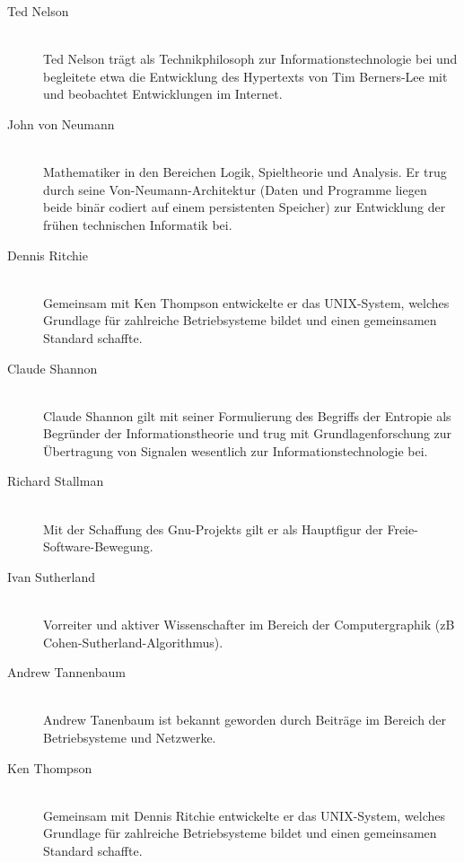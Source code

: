\begin{description}
  \item[Ted Nelson ] \hfill{} \\
    Ted Nelson trägt als Technikphilosoph zur Informationstechnologie bei und begleitete etwa die Entwicklung des Hypertexts von Tim Berners-Lee mit und beobachtet Entwicklungen im Internet.

  \item[John von Neumann ] \hfill{} \\
    Mathematiker in den Bereichen Logik, Spieltheorie und Analysis. Er trug durch seine Von-Neumann-Architektur (Daten und Programme liegen beide binär codiert auf einem persistenten Speicher) zur Entwicklung der frühen technischen Informatik bei.

  \item[Dennis Ritchie ] \hfill{} \\
    Gemeinsam mit Ken Thompson entwickelte er das UNIX-System, welches Grundlage für zahlreiche Betriebsysteme bildet und einen gemeinsamen Standard schaffte.

  \item[Claude Shannon ] \hfill{} \\
    Claude Shannon gilt mit seiner Formulierung des Begriffs der Entropie als Begründer der Informationstheorie und trug mit Grundlagenforschung zur Übertragung von Signalen wesentlich zur Informationstechnologie bei.

  \item[Richard Stallman ] \hfill{} \\
    Mit der Schaffung des Gnu-Projekts gilt er als Hauptfigur der Freie-Software-Bewegung.

  \item[Ivan Sutherland ] \hfill{} \\
    Vorreiter und aktiver Wissenschafter im Bereich der Computergraphik (zB Cohen-Sutherland-Algorithmus).

  \item[Andrew Tannenbaum ] \hfill{} \\
    Andrew Tanenbaum ist bekannt geworden durch Beiträge im Bereich der Betriebsysteme und Netzwerke.

  \item[Ken Thompson ] \hfill{} \\
    Gemeinsam mit Dennis Ritchie entwickelte er das UNIX-System, welches Grundlage für zahlreiche Betriebsysteme bildet und einen gemeinsamen Standard schaffte.


\end{description}
